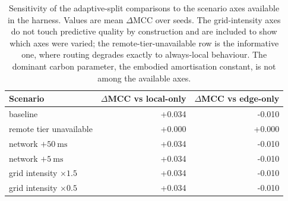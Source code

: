 \begin{table}[t]
\centering
\caption{Sensitivity of the adaptive-split comparisons to the scenario axes available in the harness. Values are mean $\Delta$MCC over seeds. The grid-intensity axes do not touch predictive quality by construction and are included to show which axes were varied; the remote-tier-unavailable row is the informative one, where routing degrades exactly to always-local behaviour. The dominant carbon parameter, the embodied amortisation constant, is not among the available axes.}
\label{tab:scenarios}
\small
\begin{tabular}{lrr}
\toprule
Scenario & $\Delta$MCC vs local-only & $\Delta$MCC vs edge-only \\
\midrule
baseline & +0.034 & -0.010 \\
remote tier unavailable & +0.000 & +0.000 \\
network $+\SI{50}{\milli\second}$ & +0.034 & -0.010 \\
network $+\SI{5}{\milli\second}$ & +0.034 & -0.010 \\
grid intensity $\times 1.5$ & +0.034 & -0.010 \\
grid intensity $\times 0.5$ & +0.034 & -0.010 \\
\bottomrule
\end{tabular}
\end{table}
